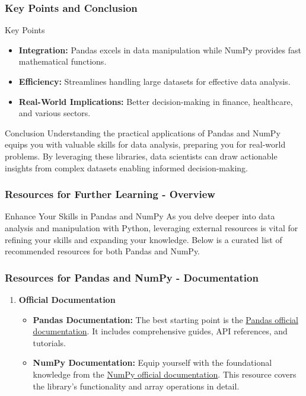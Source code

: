 \documentclass[aspectratio=169]{beamer}
\begin{document}
\begin{frame}[fragile]
    \frametitle{Key Points and Conclusion}
    
    \begin{block}{Key Points}
        \begin{itemize}
            \item \textbf{Integration:} 
            Pandas excels in data manipulation while NumPy provides fast mathematical functions.
            \item \textbf{Efficiency:} 
            Streamlines handling large datasets for effective data analysis.
            \item \textbf{Real-World Implications:} 
            Better decision-making in finance, healthcare, and various sectors.
        \end{itemize}
    \end{block}
    
    \begin{block}{Conclusion}
        Understanding the practical applications of Pandas and NumPy equips you with valuable skills for data analysis,
        preparing you for real-world problems. By leveraging these libraries, data scientists can draw actionable insights
        from complex datasets enabling informed decision-making.
    \end{block}
\end{frame}

\begin{frame}[fragile]
    \frametitle{Resources for Further Learning - Overview}
    \begin{block}{Enhance Your Skills in Pandas and NumPy}
        As you delve deeper into data analysis and manipulation with Python, leveraging external resources is vital for refining your skills and expanding your knowledge. Below is a curated list of recommended resources for both Pandas and NumPy.
    \end{block}
\end{frame}

\begin{frame}[fragile]
    \frametitle{Resources for Pandas and NumPy - Documentation}
    \begin{enumerate}
        \item \textbf{Official Documentation}
        \begin{itemize}
            \item \textbf{Pandas Documentation:} 
            The best starting point is the \href{https://pandas.pydata.org/docs/}{Pandas official documentation}. It includes comprehensive guides, API references, and tutorials.
            \item \textbf{NumPy Documentation:} 
            Equip yourself with the foundational knowledge from the \href{https://numpy.org/doc/stable/}{NumPy official documentation}. This resource covers the library's functionality and array operations in detail.
        \end{itemize}
    \end{enumerate}
\end{frame}
\end{document}
